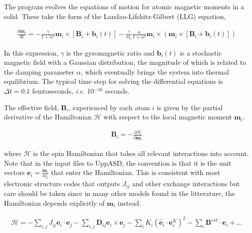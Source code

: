 \documentclass[11pt,fleqn,a4]{book} %
\begin{document}
The program evolves the equations of motion for atomic magnetic moments in a solid. These take the form of the Landau-Lifshitz-Gilbert (LLG) equation,

\begin{equationB}
\begin{align*}
 \frac{d\mathbf{m}_i}{dt}=-\frac{\gamma}{1+\alpha^2} \mathbf{m}_i \times [\mathbf{B}_{i}+\mathbf{b}_{i}(t)]-\frac{\gamma}{m_i} \frac{\alpha}{1+\alpha^2} \mathbf{m}_i \times (\mathbf{m}_i \times [\mathbf{B}_{i}+\mathbf{b}_{i}(t)])
% 
\end{align*}
\label{eq:sllg}
\end{equationB}

\noindent In this expression, $\gamma$ is the gyromagnetic ratio and $\mathbf{b}_{i}(t)$ is a stochastic magnetic field with a Gaussian distribution, the magnitude of which is related to the damping parameter $\alpha$, which eventually brings the system into thermal equilibrium. The typical time step for solving the differential equations is $\Delta t=0.1$ femtoseconds, \textit{i.e.} 10$^{-16}$ seconds.

The effective field, $\mathbf{B}_i$, experienced by each atom $\textit{i}$ is given by the partial derivative of the Hamiltonian $\mathscr{H}$ with respect to the local magnetic moment $\mathbf{m}_i$.

\begin{equationB}
\begin{align*}
  \mathbf{B}_i=-\frac{ \partial \mathscr{H} }{ \partial \mathbf{m}_i } 
\end{align*}
\label{eq:heisenberg}
\end{equationB}


\noindent where $\mathscr{H}$ is the spin Hamiltonian that takes all relevant interactions into account. Note that in the input files to UppASD, the convention is that it is the unit vectors $\mathbf{e}_i=\frac{\mathbf{m}_i}{m_i}$ that enter the Hamiltonian. This is consistent with most electronic structure codes that outputs $J_{ij}$ and other exchange interactions but care should be taken since in many other models found in the litterature, the Hamiltonian depends explicitly of $\mathbf{m}_i$ instead.

\begin{equationB}
\begin{align*}  
\mathscr{H}=-\sum_{i,j} J_{ij}\mathbf{e}_i \cdot \mathbf{e}_j - \sum_{i,j} \mathbf{D}_{ij}\mathbf{e}_i \times \mathbf{e}_j-\sum_i K_i (\hat{\mathbf{e}}_i \cdot \mathbf{e}_i^K)^2-\sum_i \mathbf{B}^{ext}\cdot\mathbf{e}_i  + \ldots 
%
\end{align*}
\label{eq:exchange}
\end{equationB}
\end{document}
